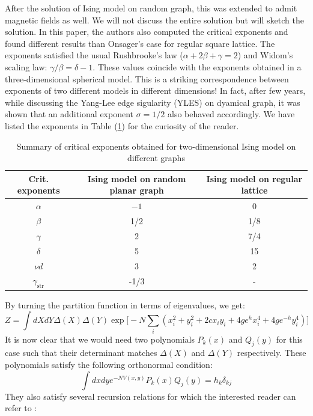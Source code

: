 \documentclass[11pt]{article}
\begin{document}
After the solution of Ising model on random graph, this was extended to admit magnetic fields
\cite{Boulatov:1986sb} as well. We will not discuss the entire solution but will 
sketch the solution. In this paper, the authors also computed the critical exponents 
and found different results than Onsager's case for regular square lattice. 
The exponents satisfied the usual Rushbrooke's law ($\alpha + 2\beta+\gamma=2$) 
and Widom's scaling law: $\gamma/\beta = \delta -1$. 
These values coincide with the  exponents obtained in a three-dimensional spherical model. 
This is a striking correspondence between exponents of two different models in different dimensions! 
In fact, after few years, while discussing the Yang-Lee edge sigularity (YLES) on dyamical graph, 
it was shown that an additional exponent $\sigma =1/2$ 
also behaved accordingly. 
We have listed the exponents in Table (\ref{table:crit_exp}) for the curiosity of the reader.
\begin{table} 
	\begin{center} 
\begin{tabular}{|c|c|c|}
	\hline Crit. exponents & Ising model on random planar graph & Ising model on regular lattice \\
	\hline$\alpha$ & $-1$ & 0 \\
	$\beta$ & 1/2 & 1/8 \\
	$\gamma$ & 2 & 7/4 \\
	$\delta$ & 5 & 15 \\
	$\nu d$ & 3 & 2 \\
	$\gamma_{\text {str}}$ & -1/3 & - \\
	\hline
\end{tabular}
\end{center} 
	\caption{Summary of critical exponents obtained for two-dimensional Ising model on different graphs} 
	\label{table:crit_exp}
	\end{table} 
By turning the partition function in terms of eigenvalues, we get:
\begin{equation}
	Z = \int dX dY \Delta(X) \Delta(Y)
	 \exp \Big[-N \sum_{i} (x_{i}^2 + y_{i}^{2} +2c x_{i}y_{i} + 4ge^{h}x_{i}^{4} + 4ge^{-h}y_{i}^4) \Big]
	\end{equation}
It is now clear that we would need two polynomials $P_{k}(x)$ and $Q_{j}(y)$ for this case such that their determinant matches $\Delta(X)$ and $\Delta(Y)$ respectively. These polynomials satisfy the following orthonormal condition: 
\begin{equation}
\int dx dy e^{-N V(x,y)} P_{k}(x) Q_{j}(y) = h_{k} \delta_{kj}
\end{equation}
They also satisfy several recursion relations for which the interested reader can refer to 
\cite{Boulatov:1986sb}:
\end{document}
